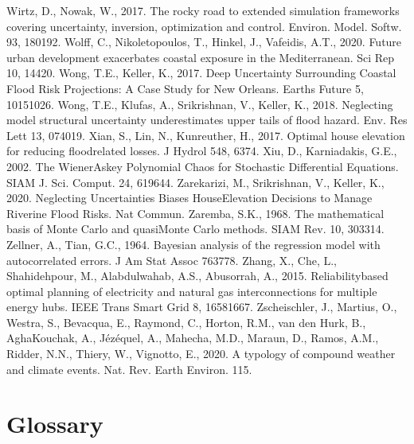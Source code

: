 \documentclass[letterpaper,10pt,english]{sphinxmanual}
\begin{document}
Wirtz, D., Nowak, W., 2017. The rocky road to extended simulation frameworks covering uncertainty, inversion, optimization and control. Environ. Model. Softw. 93, 180\textendash{}192. 
Wolff, C., Nikoletopoulos, T., Hinkel, J., Vafeidis, A.T., 2020. Future urban development exacerbates coastal exposure in the Mediterranean. Sci Rep 10, 14420. 
Wong, T.E., Keller, K., 2017. Deep Uncertainty Surrounding Coastal Flood Risk Projections: A Case Study for New Orleans. Earths Future 5, 1015\textendash{}1026. 
Wong, T.E., Klufas, A., Srikrishnan, V., Keller, K., 2018. Neglecting model structural uncertainty underestimates upper tails of flood hazard. Env. Res Lett 13, 074019. 
Xian, S., Lin, N., Kunreuther, H., 2017. Optimal house elevation for reducing flood\sphinxhyphen{}related losses. J Hydrol 548, 63\textendash{}74. 
Xiu, D., Karniadakis, G.E., 2002. The Wiener\textendash{}Askey Polynomial Chaos for Stochastic Differential Equations. SIAM J. Sci. Comput. 24, 619\textendash{}644. 
Zarekarizi, M., Srikrishnan, V., Keller, K., 2020. Neglecting Uncertainties Biases House\sphinxhyphen{}Elevation Decisions to Manage Riverine Flood Risks. Nat Commun. 
Zaremba, S.K., 1968. The mathematical basis of Monte Carlo and quasi\sphinxhyphen{}Monte Carlo methods. SIAM Rev. 10, 303\textendash{}314.
Zellner, A., Tian, G.C., 1964. Bayesian analysis of the regression model with autocorrelated errors. J Am Stat Assoc 763\textendash{}778.
Zhang, X., Che, L., Shahidehpour, M., Alabdulwahab, A.S., Abusorrah, A., 2015. Reliability\sphinxhyphen{}based optimal planning of electricity and natural gas interconnections for multiple energy hubs. IEEE Trans Smart Grid 8, 1658\textendash{}1667.
Zscheischler, J., Martius, O., Westra, S., Bevacqua, E., Raymond, C., Horton, R.M., van den Hurk, B., AghaKouchak, A., Jézéquel, A., Mahecha, M.D., Maraun, D., Ramos, A.M., Ridder, N.N., Thiery, W., Vignotto, E., 2020. A typology of compound weather and climate events. Nat. Rev. Earth Environ. 1\textendash{}15. 


\chapter{Glossary}
\label{\detokenize{9_glossary:glossary}}\label{\detokenize{9_glossary::doc}}
\end{document}
